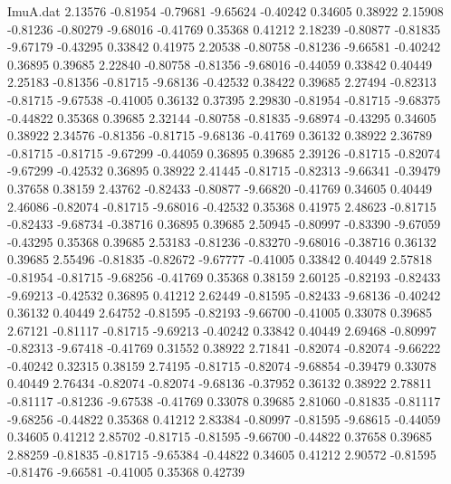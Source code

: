 \begin{filecontents}{ImuA.dat}
   2.13576   -0.81954   -0.79681   -9.65624   -0.40242    0.34605    0.38922
   2.15908   -0.81236   -0.80279   -9.68016   -0.41769    0.35368    0.41212
   2.18239   -0.80877   -0.81835   -9.67179   -0.43295    0.33842    0.41975
   2.20538   -0.80758   -0.81236   -9.66581   -0.40242    0.36895    0.39685
   2.22840   -0.80758   -0.81356   -9.68016   -0.44059    0.33842    0.40449
   2.25183   -0.81356   -0.81715   -9.68136   -0.42532    0.38422    0.39685
   2.27494   -0.82313   -0.81715   -9.67538   -0.41005    0.36132    0.37395
   2.29830   -0.81954   -0.81715   -9.68375   -0.44822    0.35368    0.39685
   2.32144   -0.80758   -0.81835   -9.68974   -0.43295    0.34605    0.38922
   2.34576   -0.81356   -0.81715   -9.68136   -0.41769    0.36132    0.38922
   2.36789   -0.81715   -0.81715   -9.67299   -0.44059    0.36895    0.39685
   2.39126   -0.81715   -0.82074   -9.67299   -0.42532    0.36895    0.38922
   2.41445   -0.81715   -0.82313   -9.66341   -0.39479    0.37658    0.38159
   2.43762   -0.82433   -0.80877   -9.66820   -0.41769    0.34605    0.40449
   2.46086   -0.82074   -0.81715   -9.68016   -0.42532    0.35368    0.41975
   2.48623   -0.81715   -0.82433   -9.68734   -0.38716    0.36895    0.39685
   2.50945   -0.80997   -0.83390   -9.67059   -0.43295    0.35368    0.39685
   2.53183   -0.81236   -0.83270   -9.68016   -0.38716    0.36132    0.39685
   2.55496   -0.81835   -0.82672   -9.67777   -0.41005    0.33842    0.40449
   2.57818   -0.81954   -0.81715   -9.68256   -0.41769    0.35368    0.38159
   2.60125   -0.82193   -0.82433   -9.69213   -0.42532    0.36895    0.41212
   2.62449   -0.81595   -0.82433   -9.68136   -0.40242    0.36132    0.40449
   2.64752   -0.81595   -0.82193   -9.66700   -0.41005    0.33078    0.39685
   2.67121   -0.81117   -0.81715   -9.69213   -0.40242    0.33842    0.40449
   2.69468   -0.80997   -0.82313   -9.67418   -0.41769    0.31552    0.38922
   2.71841   -0.82074   -0.82074   -9.66222   -0.40242    0.32315    0.38159
   2.74195   -0.81715   -0.82074   -9.68854   -0.39479    0.33078    0.40449
   2.76434   -0.82074   -0.82074   -9.68136   -0.37952    0.36132    0.38922
   2.78811   -0.81117   -0.81236   -9.67538   -0.41769    0.33078    0.39685
   2.81060   -0.81835   -0.81117   -9.68256   -0.44822    0.35368    0.41212
   2.83384   -0.80997   -0.81595   -9.68615   -0.44059    0.34605    0.41212
   2.85702   -0.81715   -0.81595   -9.66700   -0.44822    0.37658    0.39685
   2.88259   -0.81835   -0.81715   -9.65384   -0.44822    0.34605    0.41212
   2.90572   -0.81595   -0.81476   -9.66581   -0.41005    0.35368    0.42739

\end{filecontents}
